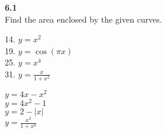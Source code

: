 \documentclass{letter}
\begin{document}
\begin{itemize}
		\textbf{6.1}\\
		
		Find the area enclosed by the given curves.\\
		\begin{minipage}[t]{0.3\textwidth}
		14. $y = x^2$\\
		19. $y = \cos(\pi x)$\\
		25. $y = x^4$\\
		31. $y = \frac{x}{1+x^2}$
		\end{minipage}
		\begin{minipage}[t]{0.6\textwidth}
			$y = 4x - x^2$\\
			$y = 4x^2 - 1$\\
			$y = 2 - |x|$\\
			$y = \frac{x^2}{1+x^3}$
		\end{minipage}\\
	\end{itemize}
\end{document}
